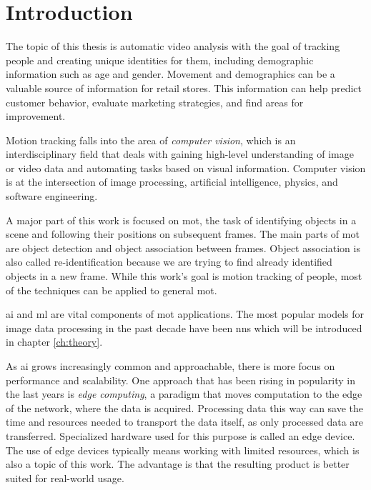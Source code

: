 \chapter{Introduction}

The topic of this thesis is automatic video analysis with the goal of tracking people and creating unique identities for them, including demographic information such as age and gender. Movement and demographics can be a valuable source of information for retail stores. This information can help predict customer behavior, evaluate marketing strategies, and find areas for improvement.

Motion tracking falls into the area of \textit{computer vision}, which is an interdisciplinary field that deals with gaining  high-level understanding of image or video data and automating tasks based on visual information. Computer vision is at the intersection of image processing, artificial intelligence, physics, and software engineering.

A major part of this work is focused on \gls{mot}, the task of identifying objects in a scene and following their positions on subsequent frames. The main parts of \gls{mot} are object detection and object association between frames. Object association is also called re-identification because we are trying to find already identified objects in a new frame. While this work's goal is motion tracking of people, most of the techniques can be applied to general \gls{mot}.

\Gls{ai} and \gls{ml} are vital components of \gls{mot} applications. The most popular models for image data processing in the past decade have been \glspl{nn} which will be introduced  in chapter \ref{ch:theory}.

As \gls{ai} grows increasingly common and approachable, there is more focus on performance and scalability. One approach that has been rising in popularity in the last years is \textit{edge computing}\cite{edgecomputing}, a paradigm that moves computation to the edge of the network, where the data is acquired. Processing data this way can save the time and resources needed to transport the data itself, as only processed data are transferred. Specialized hardware used for this purpose is called an edge device. The use of edge devices typically means working with limited resources, which is also a topic of this work. The advantage is that the resulting product is better suited for real-world usage.

